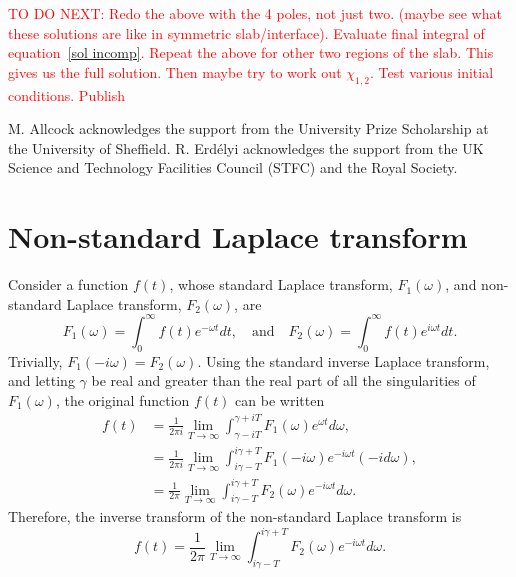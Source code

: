 \documentclass{aastex61}
\begin{document}
\textcolor{red}{TO DO NEXT: Redo the above with the 4 poles, not just two. (maybe see what these solutions are like in symmetric slab/interface). Evaluate final integral of equation~\eqref{sol incomp}. Repeat the above for other two regions of the slab. This gives us the full solution. Then maybe try to work out $\chi_{1,2}$. Test various initial conditions. Publish}



























\acknowledgments
M. Allcock acknowledges the support from the University Prize Scholarship at the University of Sheffield. R. Erd\'{e}lyi acknowledges the support from the UK Science and Technology Facilities Council (STFC) and the Royal Society. 


\appendix

\section{Non-standard Laplace transform}\label{app: laplace trans}
Consider a function $f(t)$, whose standard Laplace transform, $F_1(\omega)$, and non-standard Laplace transform, $F_2(\omega)$, are
\begin{equation}
F_1(\omega) = \int_0^\infty f(t) e^{-\omega t} dt,
\quad \text{and} \quad
F_2(\omega) = \int_0^\infty f(t) e^{i\omega t} dt.
\end{equation}
Trivially, $F_1(-i\omega) = F_2(\omega)$. Using the standard inverse Laplace transform, and letting $\gamma$ be real and greater than the real part of all the singularities of $F_1(\omega)$, the original function $f(t)$ can be written
\begin{align}
f(t) & = \frac{1}{2\pi i} \lim_{T\to\infty} \int_{\gamma - iT}^{\gamma + iT} F_1(\omega)e^{\omega t} d\omega, \\
& = \frac{1}{2\pi i} \lim_{T\to\infty} \int_{i\gamma - T}^{i\gamma + T} F_1(-i\omega)e^{-i\omega t} (-id\omega), \\
& = \frac{1}{2\pi} \lim_{T\to\infty} \int_{i\gamma - T}^{i\gamma + T} F_2(\omega)e^{-i\omega t} d\omega.
\end{align}
Therefore, the inverse transform of the non-standard Laplace transform is
\begin{equation}
f(t) = \frac{1}{2\pi} \lim_{T\to\infty} \int_{i\gamma - T}^{i\gamma + T} F_2(\omega)e^{-i\omega t} d\omega.
\end{equation}
\end{document}
